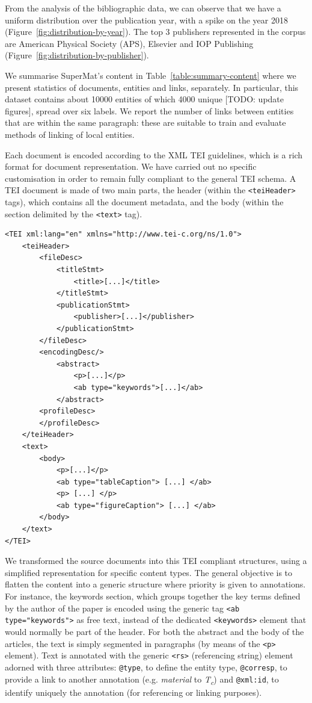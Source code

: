 \documentclass[fleqn,10pt]{wlscirep}
\begin{document}
From the analysis of the bibliographic data, we can observe that we have a uniform distribution over the publication year, with a spike on the year 2018 (Figure~\ref{fig:distribution-by-year}). The top 3 publishers represented in the corpus are American Physical Society (APS), Elsevier and IOP Publishing (Figure~\ref{fig:distribution-by-publisher}).

We summarise SuperMat's content in Table~\ref{table:summary-content} where we present statistics of documents, entities and links, separately. In particular, this dataset contains about 10000 entities of which 4000 unique [TODO: update figures], spread over six labels. 
We report the number of links between entities that are within the same paragraph: these are suitable to train and evaluate methods of linking of local entities. 


Each document is encoded according to the XML TEI guidelines, which is a rich format for document representation. We have carried out no specific customisation in order to remain fully compliant to the general TEI schema. A TEI document is made of two main parts, the header (within the \texttt{<teiHeader>} tags), which contains all the document metadata, and the body (within the section delimited by the \texttt{<text>} tag). 

\begin{verbatim}
<TEI xml:lang="en" xmlns="http://www.tei-c.org/ns/1.0">
    <teiHeader>
        <fileDesc>
            <titleStmt>
                <title>[...]</title>
            </titleStmt>
            <publicationStmt>
                <publisher>[...]</publisher>
            </publicationStmt>
        </fileDesc>
        <encodingDesc/>
            <abstract>
                <p>[...]</p>
                <ab type="keywords">[...]</ab>
            </abstract>
        <profileDesc>
        </profileDesc>
    </teiHeader>
    <text>
        <body>
            <p>[...]</p>
            <ab type="tableCaption"> [...] </ab>
            <p> [...] </p>
            <ab type="figureCaption"> [...] </ab> 
        </body>
    </text>
</TEI>
\end{verbatim}

We transformed the source documents into this TEI compliant structures, using a simplified representation for specific content types. The general objective is to flatten the content into a generic structure where priority is given to annotations.
For instance, the keywords section, which groups together the key terms defined by the author of the paper is encoded using the generic tag \texttt{<ab type="keywords">} as free text, instead of the dedicated \texttt{<keywords>} element that would normally be part of the header. 
For both the abstract and the body of the articles, the text is simply segmented in paragraphs (by means of the \texttt{<p>} element). 
Text is annotated with the generic \texttt{<rs>} (referencing string) element adorned with three attributes: \texttt{@type}, to define the entity type, \texttt{@corresp}, to provide a link to another annotation (e.g. \textit{material} to \textit{T\textsubscript{c}}) and \texttt{@xml:id}, to identify uniquely the annotation (for referencing or linking purposes).
\end{document}
